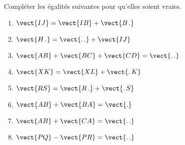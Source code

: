 
\begin{exercice}\label{exosmath-0065}

    Compléter les égalités suivantes pour qu'elles soient vraies.
    \begin{multicols}{3}
        \begin{enumerate}
            \item
                \( \vect{ IJ }=\vect{ IB }+\vect{ B\,. }\) 
            \item
                \( \vect{ H\,. }=\vect{ .\,.\vphantom{H} }+\vect{ IJ }\)
            \item
                \( \vect{ AB }+\vect{ BC }+\vect{ CD }=\vect{ .\,.\vphantom{H} }\)
            \item
                \( \vect{ XK }=\vect{ XL }+\vect{ .\,K }\)
            \item
                \( \vect{ RS }=\vect{ R\,. }+\vect{ .\,S }\)
            \item
                \( \vect{ AB }+\vect{ BA }=\vect{ .\vphantom{H} }\)
            \item
                \( \vect{ AB }+\vect{ CA }=\vect{ .\,.\vphantom{H} }\)
            \item
                \( \vect{ PQ }-\vect{ PR }=\vect{ .\,.\vphantom{H} }\)
        \end{enumerate}
    \end{multicols}

\end{exercice}
